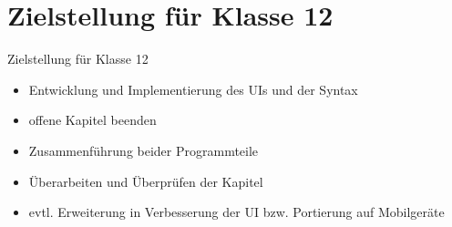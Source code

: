 \documentclass{beamer}
\begin{document}
\section{Zielstellung für Klasse 12}
\begin{frame}{Zielstellung für Klasse 12}
\pause
\begin{itemize}
\item Entwicklung und Implementierung des UIs und der Syntax
\pause
\item offene Kapitel beenden
\pause
\item Zusammenführung beider Programmteile
\pause
\item Überarbeiten und Überprüfen der Kapitel
\pause
\item evtl. Erweiterung in Verbesserung der UI bzw. Portierung auf Mobilgeräte
\end{itemize}
\end{frame}
\begin{frame}
	
  \titlepage
\end{frame}
\end{document}
